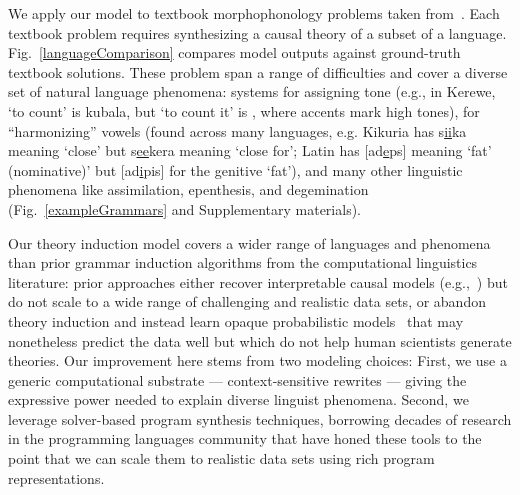 \documentclass[12pt]{article}
\begin{document}
We apply our model to textbook morphophonology problems taken from~\cite{9780511808869}.
Each textbook problem requires synthesizing a
causal theory of a subset of a language.
Fig.~\ref{languageComparison}
compares model outputs against 
ground-truth textbook solutions.
These problem span a range of difficulties
and cover a diverse set of natural language phenomena:
systems for assigning tone (e.g., in Kerewe,
`to count' is kubala, but `to count it' is , where accents mark high tones),
for ``harmonizing'' vowels (found across many languages, e.g. Kikuria
has s\underline{ii}ka meaning `close' but s\underline{ee}kera meaning `close for';
Latin has [ad\underline{e}ps] meaning `fat' (nominative)' but [ad\underline{i}pis] for the genitive `fat'),
and many other linguistic phenomena like
assimilation, epenthesis, and degemination (Fig.~\ref{exampleGrammars} and Supplementary materials).

Our theory induction model covers a wider range of languages and
phenomena than prior grammar induction algorithms from the
computational linguistics literature: prior approaches either recover
interpretable causal models
(e.g.,~\cite{Albright03rulesvs,gildea1996learning,rasin2015learning})
but do not scale to a wide range of challenging and realistic data
sets, or abandon theory induction and instead learn opaque
probabilistic models~\cite{cotterell-peng-eisner-2015} that may
nonetheless predict the data well but which do not help human
scientists generate theories.  Our improvement here stems from two
modeling choices: First, we use a generic computational substrate ---
context-sensitive rewrites --- giving the expressive power needed to
explain diverse linguist phenomena.  Second, we leverage solver-based
program synthesis techniques, borrowing decades of
research in the programming languages community that have honed these
tools to the point that we can scale them to
realistic data sets using rich program representations.

\end{document}
